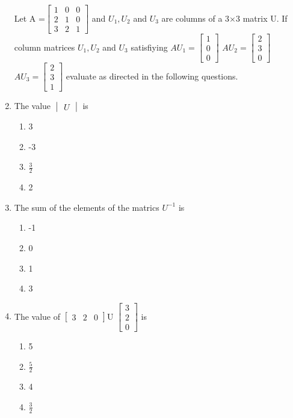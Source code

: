 \begin{enumerate}[label=\arabic*.,ref=\thesubsection.\theenumi]
Let A =$\begin{bmatrix}
1& 0& 0 \\ 2&1&0 \\3&2&1 
\end{bmatrix}$ and $U_1,U_2$ and $U_3$ are columns of a 3$\times$3 matrix U. If column matrices $U_1,U_2$ and $U_3$ satisfiying $AU_1= \begin{bmatrix}
1 \\0 \\0
\end{bmatrix}$ $AU_2= \begin{bmatrix}
2 \\3 \\0
\end{bmatrix}$ $AU_3= \begin{bmatrix}
2 \\3 \\1
\end{bmatrix}$ evaluate as directed in the following questions.
\item The value $\begin{vmatrix} U \end{vmatrix}$ is 
\begin{enumerate}
\item 3
\item -3
\item $\frac{3}{2}$
\item 2
\end{enumerate}
\item The sum of the elements of the matrics $U^{-1}$ is 
\begin{enumerate}
\item -1
\item 0
\item 1
\item 3
\end{enumerate}
\item The value of $\begin{bmatrix}
3&2&0 
\end{bmatrix}$U $\begin{bmatrix}
3 \\ 2 \\0
\end{bmatrix}$ is 
\begin{enumerate}
\item 5
\item $\frac{5}{2}$
\item 4
\item $\frac{3}{2}$
\end{enumerate}


\end{enumerate}
